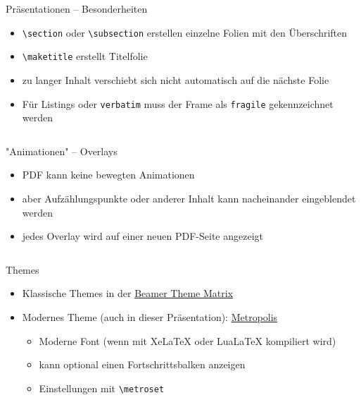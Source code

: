\documentclass[presentation,aspectratio=169]{beamer}
\begin{document}
\begin{frame}[fragile]{Präsentationen -- Besonderheiten}
  \begin{itemize}
    \item \verb|\section| oder \verb|\subsection| erstellen einzelne Folien mit den Überschriften
    \item \verb|\maketitle| erstellt Titelfolie
    \item zu langer Inhalt verschiebt sich nicht automatisch auf die nächste Folie
    \item Für Listings oder \verb|verbatim| muss der Frame als \verb|fragile| gekennzeichnet werden
      \inputminted{latex}{codebeispiele/frame-fragile.tex}
  \end{itemize}
\end{frame}

\begin{frame}[fragile]{"Animationen" -- Overlays}
  \begin{itemize}
    \item PDF kann keine bewegten Animationen
    \item aber Aufzählungspunkte oder anderer Inhalt kann nacheinander eingeblendet werden
    \item jedes Overlay wird auf einer neuen PDF-Seite angezeigt
      \inputminted{latex}{codebeispiele/beamer-overlays.tex}
  \end{itemize}
\end{frame}

\begin{frame}[fragile]{Themes}
  \begin{itemize}
    \item Klassische Themes in der \href{https://hartwork.org/beamer-theme-matrix/}{Beamer Theme Matrix}
    \item Modernes Theme (auch in dieser Präsentation): \href{https://ctan.org/pkg/beamertheme-metropolis}{Metropolis}
      \begin{itemize}
        \item Moderne Font (wenn mit Xe\LaTeX{} oder Lua\LaTeX{} kompiliert wird)
        \item kann optional einen Fortschrittsbalken anzeigen
        \item Einstellungen mit \verb|\metroset|
      \end{itemize}
  \end{itemize}
\end{frame}
\end{document}

